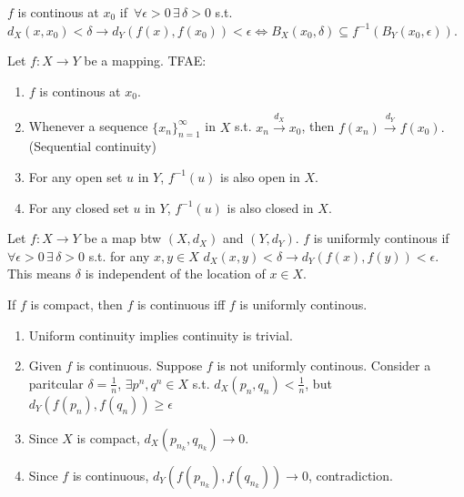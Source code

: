 \documentclass[12pt]{article}
\begin{document}
\begin{bbox}
\begin{definition}[Continuity]
    $f$ is continous at $x_0$ if
    $\,\forall \epsilon>0\, \exists\, \delta>0$ s.t. $d_X(x,x_0)<\delta\rightarrow d_Y(f(x),f(x_0))<\epsilon \Leftrightarrow B_X(x_0,\delta)\subseteq f^{-1}(B_Y(x_0, \epsilon))$.

\end{definition}
\begin{theorem}
    Let $f:X\rightarrow Y$ be a mapping. TFAE:
\begin{enumerate}
    \item $f$ is continous at $x_0$.
    \item Whenever a sequence $\{x_n\}^\infty_{n=1}$ in $X$ s.t. $x_n\xrightarrow{d_X} x_0$, then $f(x_n)\xrightarrow{d_Y} f(x_0).$ (Sequential continuity)
    \item For any open set $u$ in $Y$, $f^{-1}(u)$ is also open in $X$.
    \item For any closed set $u$ in $Y$, $f^{-1}(u)$ is also closed in $X$.
\end{enumerate}
\end{theorem}
\end{bbox}


\begin{bbox}
\begin{definition}
    Let $f: X\rightarrow Y$ be a map btw $(X,d_X)$ and $(Y,d_Y)$.
    $f$ is uniformly continous if $\forall \epsilon>0\,\exists\,\delta>0$ s.t. for any $x,y\in X$ $d_X(x,y)<\delta\rightarrow d_Y(f(x),f(y))<\epsilon.$
    This means $\delta$ is independent of the location of $x\in X$.
\end{definition}
\end{bbox}

\begin{theorem}
    If $f$ is compact, then $f$ is continuous iff $f$ is uniformly continous.
\end{theorem}

\begin{pfbox}
    \begin{enumerate}
        \item Uniform continuity implies continuity is trivial.
        \item Given $f$ is continuous. Suppose $f$ is not uniformly continous. Consider a paritcular $\delta=\frac{1}{n}$, $\exists p^n, q^n\in X$ s.t. $d_X(p_n, q_n)<\frac{1}{n}$,
              but $d_Y(f(p_n), f(q_n))\geq\epsilon$
        \item Since $X$ is compact, $d_X(p_{n_k}, q_{n_k})\rightarrow 0$.
        \item Since $f$ is continuous, $d_Y(f(p_{n_k}),f(q_{n_k}))\rightarrow 0$, contradiction.
    \end{enumerate}
\end{pfbox}
\end{document}
